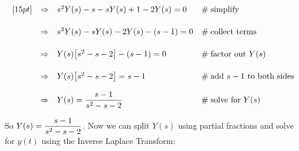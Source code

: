 \documentclass{article}
\theoremstyle{definition}
\begin{document}
\begin{equation*}
\begin{array}{lllll}
[15pt]
&\Rightarrow&  s^2 Y(s) -s  - sY(s) + 1 -2 Y(s)                                                                                      = 0             &\mathrel{\#} \text{simplify}                                                                                                                 \\
[15pt]          
&\Rightarrow&  s^2 Y(s) - s Y(s) - 2 Y(s) - (s - 1)                                                                                   = 0             &\mathrel{\#} \text{collect terms}                                                                                                         \\
[15pt]
&\Rightarrow&  Y(s) \big [s^2- s - 2 \big] - (s - 1)                                                                                   = 0             &\mathrel{\#} \text{factor out $Y(s)$}                                                                                                   \\
[15pt]
&\Rightarrow&  Y(s) \big [s^2- s - 2 \big]                                                                                               = s - 1         &\mathrel{\#} \text{add $s - 1$ to both sides}                                                                                      \\
[12pt]
&\Rightarrow&  Y(s) = \mathlarger{\frac{s - 1}{s^2 -s -2}}  &\mathrel{\#} \text{solve for $Y(s)$}
\end{array}
\end{equation*}

\bigskip
\noindent
So $Y(s) = \mathlarger{\frac{s - 1}{s^2 -s -2}}$. Now we can
split $Y(s)$ using partial fractions and solve for $y(t)$ using
the Inverse Laplace Transform:
\end{document}
